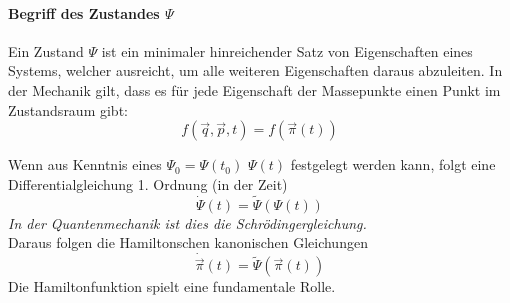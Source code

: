 \documentclass[oneside]{book}
\theoremstyle{definition}
\newcommand{\dotvec}[1]{\dot{\vec{#1}}}
\begin{document}
\paragraph{Begriff des Zustandes $\Psi$}
Ein Zustand $\Psi$ ist ein minimaler hinreichender Satz von Eigenschaften eines Systems, welcher ausreicht, um alle weiteren Eigenschaften daraus abzuleiten. In der Mechanik gilt, dass es für jede Eigenschaft der Massepunkte einen Punkt im Zustandsraum gibt: 
$$f(\vec{q}, \vec{p}, t) = f(\vec{\pi}(t))$$


Wenn aus Kenntnis eines $\Psi_0 = \Psi(t_0)$ $\Psi(t)$ festgelegt werden kann, folgt eine Differentialgleichung 1. Ordnung (in der Zeit)
$$\dot{\Psi}(t) = \tilde{\Psi}(\Psi(t))$$
\textit{In der Quantenmechanik ist dies die Schrödingergleichung.}\\
Daraus folgen die Hamiltonschen kanonischen Gleichungen
$$\dotvec \pi (t) = \tilde{\Psi}(\vec{\pi}(t))$$
Die Hamiltonfunktion spielt eine fundamentale Rolle.

\newcommand{\vpi}{\vec{\pi}}
\newcommand{\poisson}[1]{\{#1\}_{\vec{p}, \vec{q}}}
\end{document}

